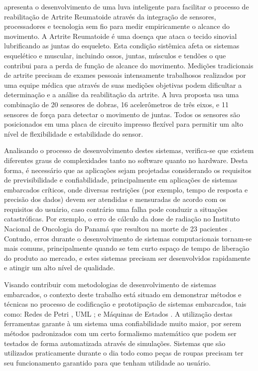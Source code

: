  apresenta o desenvolvimento de uma luva inteligente para facilitar o processo de reabilitação de Artrite Reumatoide \cite{ar:2008} através da integração de sensores, processadores e tecnologia sem fio para medir empiricamente o alcance do movimento. A Artrite Reumatoide é uma doença que ataca o tecido sinovial lubrificando as juntas do esqueleto. Esta condição sistêmica afeta os sistemas esquelético e muscular, incluindo ossos, juntas, músculos e tendões o que contribui para a perda de função de alcance do movimento. Medições tradicionais de artrite precisam de exames pessoais intensamente trabalhosos realizados por uma equipe médica que através de suas medições objetivas podem dificultar a determinação e a análise da reabilitação da artrite. A luva proposta \cite{OFLYNN:2013} usa uma combinação de 20 sensores de dobras, 16 acelerômetros de três eixos, e 11 sensores de força para detectar o movimento de juntas. Todos os sensores são posicionados em uma placa de circuito impresso flexível para permitir um alto nível de flexibilidade e estabilidade do sensor.


Analisando o processo de desenvolvimento destes sistemas, verifica-se que existem diferentes graus de complexidades tanto no software quanto no hardware. Desta forma, é necessário que as aplicações sejam projetadas considerando os requisitos de previsibilidade e confiabilidade, principalmente em aplicações de sistemas embarcados críticos, onde diversas restrições (por exemplo, tempo de resposta e precisão dos dados) devem ser atendidas e mensuradas de acordo com os requisitos do usuário, caso contrário uma falha pode conduzir a situações catastróficas. Por exemplo, o erro de cálculo da dose de radiação no Instituto Nacional de Oncologia do Panamá que resultou na morte de 23 pacientes \cite{WONG:2010}. Contudo, erros durante o desenvolvimento de sistemas computacionais tornam-se mais comuns, principalmente quando se tem curto espaço de tempo de liberação do produto ao mercado, e estes sistemas precisam ser desenvolvidos rapidamente e atingir um alto nível de qualidade. 


Visando contribuir com metodologias de desenvolvimento de sistemas embarcados, o contexto deste trabalho está situado em demonstrar métodos e técnicas no processo de codificação e prototipação de sistemas embarcados, tais como: Redes de Petri \cite{BENDERS:1992} \cite{VALK:2002}, UML \cite{ROCHA:2011}; e Máquinas de Estados \cite{LAMPKA:2009}. A utilização destas ferramentas garante à um sistema uma confiabilidade muito maior, por serem métodos padronizados com um certo formalismo matemático que podem ser testados de forma automatizada através de simulações. Sistemas que são utilizados praticamente durante o dia todo como peças de roupas precisam ter seu funcionamento garantido para que tenham utilidade ao usuário.


